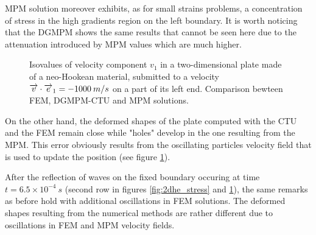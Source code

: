 MPM solution moreover exhibits, as for small strains problems, a concentration of stress in the high gradients region on the left boundary. It is worth noticing that the DGMPM shows the same results that cannot be seen here due to the attenuation introduced by MPM values which are much higher.
\begin{figure}[h!]
  \centering
  
  \caption{Isovalues of velocity component $v_1$ in a two-dimensional plate made of a neo-Hookean material, submitted to a velocity ${\overrightarrow{v}}\cdot{\overrightarrow{e}}_1=-1000 \: m/s$ on a part of its left end. Comparison bewteen FEM, DGMPM-CTU and MPM solutions.}
  \label{fig:2dhe_velo}
\end{figure}
On the other hand, the deformed shapes of the plate computed with the CTU and the FEM remain close while "holes" develop in the one resulting from the MPM. This error obviously results from the oscillating particles velocity field that is used to update the position (see figure \ref{fig:2dhe_velo}).

After the reflection of waves on the fixed boundary occuring at time $t=6.5\times 10^{-4}\:s$ (second row in figures \ref{fig:2dhe_stress} and \ref{fig:2dhe_velo}), the same remarks as before hold with additional oscillations in FEM solutions. The deformed shapes resulting from the numerical methods are rather different due to oscillations in FEM and MPM velocity fields.


